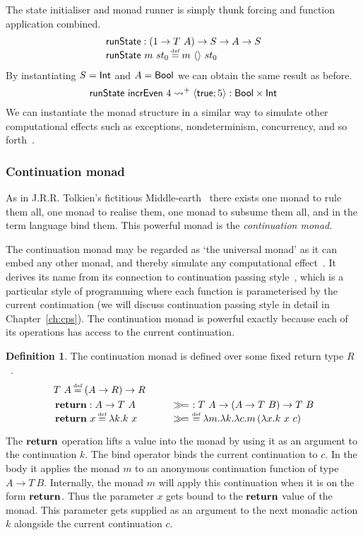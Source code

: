 \documentclass[12pt,phd,lfcs,twoside,openright,logo,leftchapter,normalheadings]{infthesis}
\theoremstyle{plain}
\theoremstyle{definition}
\newtheorem{definition}[theorem]{Definition}
\begin{document}
The state initialiser and monad runner is simply thunk forcing and
function application combined.
%
\[
  \bl
    \runState : (\UnitType \to T~A) \to S \to A \to S\\
    \runState~m~st_0 \defas m~\Unit~st_0\\
   \el
\]
%
By instantiating $S = \mathsf{Int}$ and $A = \mathsf{Bool}$ we can obtain the same
result as before.
%
\[
  \mathsf{runState}~\mathsf{incrEven}~4 \leadsto^+ \langle \mathsf{true};5 \rangle : \mathsf{Bool} \times \mathsf{Int}
\]
%
We can instantiate the monad structure in a similar way to simulate
other computational effects such as exceptions, nondeterminism,
concurrency, and so forth~\cite{Moggi91,Wadler92}.

\subsubsection{Continuation monad}
As in J.R.R. Tolkien's fictitious Middle-earth~\cite{Tolkien54} there
exists one monad to rule them all, one monad to realise them, one
monad to subsume them all, and in the term language bind them. This
powerful monad is the \emph{continuation monad}.

The continuation monad may be regarded as `the universal monad' as it
can embed any other monad, and thereby simulate any computational
effect~\cite{Filinski99}. It derives its name from its connection to
continuation passing style~\cite{Wadler92}, which is a particular
style of programming where each function is parameterised by the
current continuation (we will discuss continuation passing style in
detail in Chapter~\ref{ch:cps}). The continuation monad is powerful
exactly because each of its operations has access to the current
continuation.


\begin{definition}\label{def:cont-monad}
  The continuation monad is defined over some fixed return type
  $R$~\cite{Wadler92}.
  \[
    \ba{@{~}l@{\qquad\quad}@{~}r}
      \multicolumn{2}{l}{T~A \defas (A \to R) \to R} \smallskip\\
      \multirow{2}{*}{
        \bl
         \Return : A \to T~A\\
         \Return~x\defas \lambda k.k~x
        \el} &
      \multirow{2}{*}{
        \bl
          \bind ~: T~A \to (A \to T~B) \to T~B\\
          \bind ~\defas \lambda m.\lambda k.\lambda c.m\,(\lambda x.k~x~c)
          \el} \\ & %
    \ea
  \]
\end{definition}
%
The $\mathbf{return}$ operation lifts a value into the monad by using it as an
argument to the continuation $k$. The bind operator binds the current
continuation to $c$. In the body it applies the monad $m$ to an
anonymous continuation function of type $A \to T~B$. Internally, the
monad $m$ will apply this continuation when it is on the form
$\mathbf{return}$. Thus the parameter $x$ gets bound to the $\mathbf{return}$ value of
the monad. This parameter gets supplied as an argument to the next
monadic action $k$ alongside the current continuation $c$.
\end{document}
